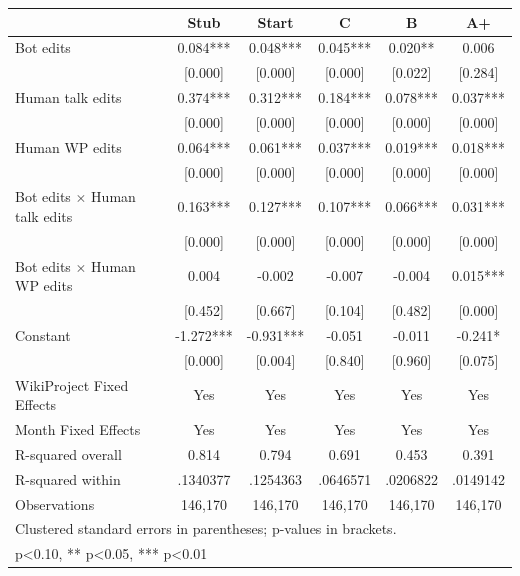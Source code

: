 {
\def\sym#1{\ifmmode^{#1}\else\(^{#1}\)\fi}
\begin{tabular}{l*{5}{c}}
\toprule
                    &\multicolumn{1}{c}{Stub}&\multicolumn{1}{c}{Start}&\multicolumn{1}{c}{C}&\multicolumn{1}{c}{B}&\multicolumn{1}{c}{A+}\\
\midrule
Bot edits           &     0.084***&     0.048***&     0.045***&     0.020** &     0.006   \\
                    &   [0.000]   &   [0.000]   &   [0.000]   &   [0.022]   &   [0.284]   \\
Human talk edits    &     0.374***&     0.312***&     0.184***&     0.078***&     0.037***\\
                    &   [0.000]   &   [0.000]   &   [0.000]   &   [0.000]   &   [0.000]   \\
Human WP edits      &     0.064***&     0.061***&     0.037***&     0.019***&     0.018***\\
                    &   [0.000]   &   [0.000]   &   [0.000]   &   [0.000]   &   [0.000]   \\
Bot edits $\times$ Human talk edits&     0.163***&     0.127***&     0.107***&     0.066***&     0.031***\\
                    &   [0.000]   &   [0.000]   &   [0.000]   &   [0.000]   &   [0.000]   \\
Bot edits $\times$ Human WP edits&     0.004   &    -0.002   &    -0.007   &    -0.004   &     0.015***\\
                    &   [0.452]   &   [0.667]   &   [0.104]   &   [0.482]   &   [0.000]   \\
Constant            &    -1.272***&    -0.931***&    -0.051   &    -0.011   &    -0.241*  \\
                    &   [0.000]   &   [0.004]   &   [0.840]   &   [0.960]   &   [0.075]   \\
WikiProject Fixed Effects&       Yes   &       Yes   &       Yes   &       Yes   &       Yes   \\
Month Fixed Effects &       Yes   &       Yes   &       Yes   &       Yes   &       Yes   \\
\midrule
R-squared overall   &     0.814   &     0.794   &     0.691   &     0.453   &     0.391   \\
R-squared within    &  .1340377   &  .1254363   &  .0646571   &  .0206822   &  .0149142   \\
Observations        &   146,170   &   146,170   &   146,170   &   146,170   &   146,170   \\
\bottomrule
\multicolumn{6}{l}{\footnotesize Clustered standard errors in parentheses; p-values in brackets.}\\
\multicolumn{6}{l}{\footnotesize * p<0.10, ** p<0.05, *** p<0.01}\\
\end{tabular}
}
